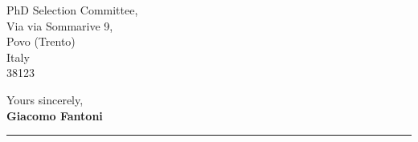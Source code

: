 \documentclass[11pt, a4paper, roman]{letter}
\begin{document}
\begin{minipage}[t]{\textwidth}
\begin{letter} {PhD Selection Committee,\\
Via via Sommarive 9,  \\Povo (Trento)\\Italy\\38123}
{}

Yours sincerely,\\\textbf{Giacomo Fantoni}

\vspace*{\fill}

{\color{cvteal} \rule{\linewidth}{1mm}}
\end{letter}
\end{minipage}
\end{document}
